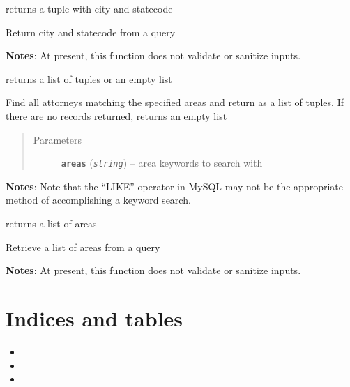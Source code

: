 \documentclass[letterpaper,10pt,english]{sphinxmanual}
\begin{document}

\begin{fulllineitems}
\label{DBOps:DBOps.searchAdvancedPreamble}
returns a tuple with city and statecode

Return city and statecode from a query

\textbf{Notes}:
At present, this function does not validate or sanitize inputs.

\end{fulllineitems}


\begin{fulllineitems}
\label{DBOps:DBOps.searchStandard}
returns a list of tuples or an empty list

Find all attorneys matching the specified areas and return as a list of tuples. If there are no records returned, returns an empty list
\begin{quote}\begin{description}
\item[{Parameters}] \leavevmode
\textbf{\texttt{areas}} (\emph{\texttt{string}}) -- area keywords to search with

\end{description}\end{quote}

\textbf{Notes}:
Note that the ``LIKE'' operator in MySQL may not be the appropriate method of accomplishing a keyword search.

\end{fulllineitems}


\begin{fulllineitems}
\label{DBOps:DBOps.searchStandardPreamble}
returns a list of areas

Retrieve a list of areas from a query

\textbf{Notes}:
At present, this function does not validate or sanitize inputs.

\end{fulllineitems}



\chapter{Indices and tables}
\label{index:indices-and-tables}\begin{itemize}
\item {} 

\item {} 

\item {} 

\end{itemize}
\end{document}
